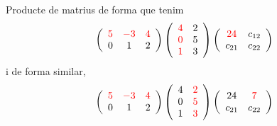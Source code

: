 \documentclass{beamer}
\begin{document}
\begin{frame}
\begin{exampleblock}{Producte de matrius}
de forma que tenim $$\left(\begin{array}{ccc}
{\color{red}5} & {\color{red}-3} & {\color{red}4}\\
0 & 1 & 2\end{array}\right)\left(\begin{array}{cc}
{\color{red}4} & 2\\
{\color{red}0} & 5\\
{\color{red}1} & 3\end{array}\right)\left(\begin{array}{cc}
{\color{red}24} & c_{12}\\
c_{21} & c_{22}\end{array}\right)$$ i de forma similar, $$\left(\begin{array}{ccc}
{\color{red}5} & {\color{red}-3} & {\color{red}4}\\
0 & 1 & 2\end{array}\right)\left(\begin{array}{cc}
4 & {\color{red}2}\\
0 & {\color{red}5}\\
1 & {\color{red}3}\end{array}\right)\left(\begin{array}{cc}
24 & {\color{red}7}\\
c_{21} & c_{22}\end{array}\right)$$
\end{exampleblock}
\end{frame}
\end{document}
